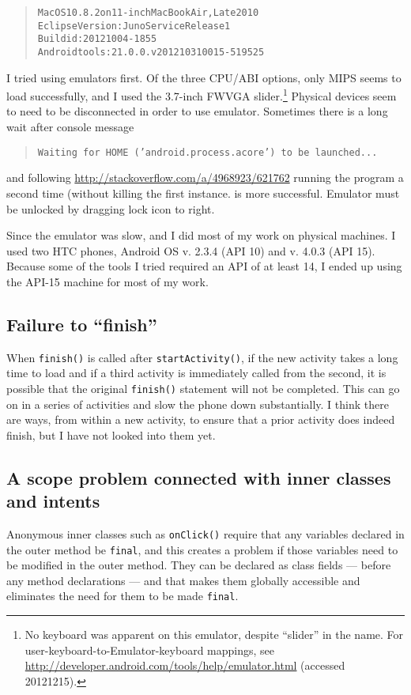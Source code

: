 \documentclass[11pt,asymmetric]{article}
\begin{document}
\begin{quote}
\begin{alltt}
Mac OS 10.8.2 on 11-inch MacBook Air, Late 2010
Eclipse Version: Juno Service Release 1
Build id: 20121004-1855
Android tools: 21.0.0.v201210310015-519525
\end{alltt}

\end{quote}
I tried using emulators first. Of the three CPU/ABI options, only MIPS seems to load successfully, and I used the 3.7-inch FWVGA slider.\footnote{No keyboard was apparent on this emulator, despite ``slider'' in the name. For user-keyboard-to-Emulator-keyboard mappings, see \url{http://developer.android.com/tools/help/emulator.html} (accessed 20121215).} Physical devices seem to need to be disconnected in order to use emulator. Sometimes there is a long wait after console message\begin{quote}
\texttt{Waiting for HOME ('android.process.acore') to be launched...}
\end{quote}and following \url{http://stackoverflow.com/a/4968923/621762} running the program a second time (without killing the first instance. is more successful. Emulator must be unlocked by dragging lock icon to right.

Since the emulator was slow, and I did most of my work on physical machines. I used two HTC phones, Android OS v. 2.3.4 (API 10) and v. 4.0.3 (API 15). Because some of the tools I tried required an API of at least 14, I ended up using the API-15 machine for most of my work.


\subsection{Failure to ``finish''}
When \texttt{finish()} is called after \texttt{startActivity()}, if the new activity takes a long time to load and if a third activity is immediately called from the second, it is possible that the original \texttt{finish()} statement will not be completed. This can go on in a series of activities and slow the phone down substantially. I think there are ways, from within a new activity, to ensure that a prior activity does indeed finish, but I have not looked into them yet.


\subsection{A scope problem connected with inner classes and intents}
Anonymous inner classes such as \texttt{onClick()} require that any variables declared in the outer method be \texttt{final}, and this creates a problem if those variables need to be modified in the outer method. They can be declared as class fields --- before any method declarations --- and that makes them globally accessible and eliminates the need for them to be made \texttt{final}.
\end{document}

